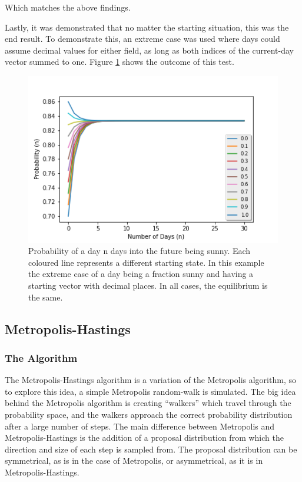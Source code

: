 \documentclass[twocolumn]{article}
\begin{document}
Which matches the above findings.

Lastly, it was demonstrated that no matter the starting situation, this was the end result. To demonstrate this, an extreme case was used where days could assume decimal values for either field, as long as both indices of the current-day vector summed to one. Figure \ref{fig:fig14} shows the outcome of this test.

\begin{figure}
\centering
\includegraphics[width=\linewidth]{fig14}
\caption{Probability of a day n days into the future being sunny. Each coloured line represents a different starting state. In this example the extreme case of a day being a fraction sunny and having a starting vector with decimal places. In all cases, the equilibrium is the same.}
\label{fig:fig14}
\end{figure}

\subsection{Metropolis-Hastings}
\subsubsection{The Algorithm}
The Metropolis-Hastings algorithm is a variation of the Metropolis algorithm, so
to explore this idea, a simple Metropolis random-walk is simulated. The big idea
behind the Metropolis algorithm is creating ``walkers'' which travel through the
probability space, and the walkers approach the correct probability distribution
after a large number of steps. The main difference between Metropolis and
Metropolis-Hastings is the addition of a proposal distribution from which the
direction and size of each step is sampled from. The proposal distribution can
be symmetrical, as is in the case of Metropolis, or asymmetrical, as it is in
Metropolis-Hastings.
\end{document}
